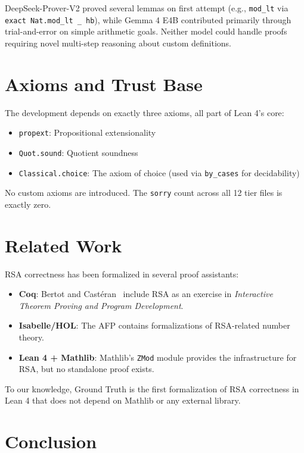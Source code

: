 \documentclass[11pt]{article}
\begin{document}
DeepSeek-Prover-V2 proved several lemmas on first attempt (e.g., \texttt{mod\_lt} via \texttt{exact Nat.mod\_lt \_ hb}), while Gemma 4 E4B contributed primarily through trial-and-error on simple arithmetic goals. Neither model could handle proofs requiring novel multi-step reasoning about custom definitions.

\section{Axioms and Trust Base}

The development depends on exactly three axioms, all part of Lean 4's core:
\begin{itemize}
    \item \texttt{propext}: Propositional extensionality
    \item \texttt{Quot.sound}: Quotient soundness
    \item \texttt{Classical.choice}: The axiom of choice (used via \texttt{by\_cases} for decidability)
\end{itemize}

No custom axioms are introduced. The \texttt{sorry} count across all 12 tier files is exactly zero.

\section{Related Work}

RSA correctness has been formalized in several proof assistants:
\begin{itemize}
    \item \textbf{Coq}: Bertot and Cast\'{e}ran~\cite{bertot2004} include RSA as an exercise in \textit{Interactive Theorem Proving and Program Development}.
    \item \textbf{Isabelle/HOL}: The AFP contains formalizations of RSA-related number theory.
    \item \textbf{Lean 4 + Mathlib}: Mathlib's \texttt{ZMod} module provides the infrastructure for RSA, but no standalone proof exists.
\end{itemize}

To our knowledge, Ground Truth is the first formalization of RSA correctness in Lean 4 that does not depend on Mathlib or any external library.

\section{Conclusion}
\end{document}
